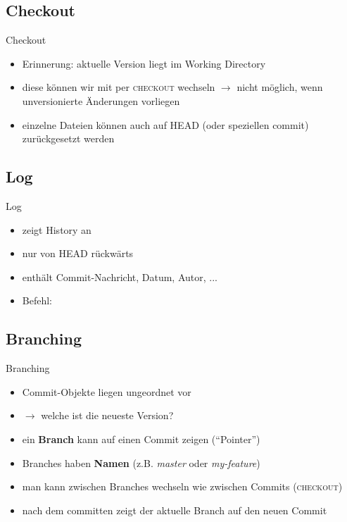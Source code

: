 \subsection{Checkout}
\begin{frame}{Checkout}
    \begin{itemize}
        \item Erinnerung: aktuelle Version liegt im Working Directory
        \item diese können wir mit per \textsc{checkout} wechseln
            $\rightarrow$ nicht möglich, wenn unversionierte Änderungen vorliegen
        \item einzelne Dateien können auch auf HEAD (oder speziellen commit)
            zurückgesetzt werden
    \end{itemize}
\end{frame}


\subsection{Log}
\begin{frame}{Log}
    \begin{itemize}
        \item zeigt History an
        \item nur von HEAD rückwärts
        \item enthält Commit-Nachricht, Datum, Autor, ...
        \item Befehl:
    \end{itemize}
\end{frame}

\subsection{Branching}
\begin{frame}{Branching}
    \begin{itemize}
        \item Commit-Objekte liegen ungeordnet vor
        \item $\rightarrow$ welche ist die neueste Version?
        \item ein \textbf{Branch} kann auf einen Commit zeigen (``Pointer'')
        \item Branches haben \textbf{Namen} (z.B. \textit{master} oder \textit{my-feature})
        \item man kann zwischen Branches wechseln wie zwischen Commits (\textsc{checkout})
        \item nach dem committen zeigt der aktuelle Branch auf den neuen Commit
    \end{itemize}
\end{frame}

